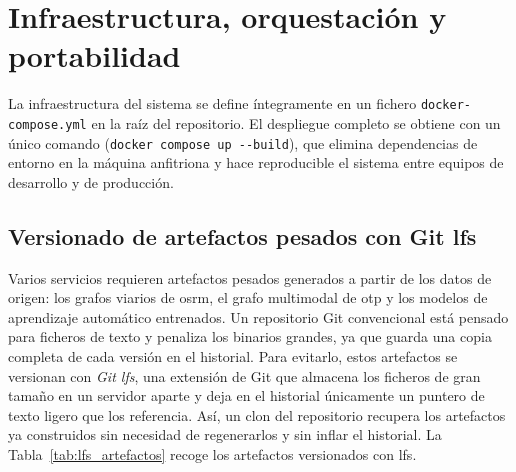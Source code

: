 \section{Infraestructura, orquestación y portabilidad}
\label{sec:arch_infra}

La infraestructura del sistema se define íntegramente en un fichero \texttt{docker-compose.yml} en la raíz del repositorio. El despliegue completo se obtiene con un único comando (\texttt{docker compose up -{}-build}), que elimina dependencias de entorno en la máquina anfitriona y hace reproducible el sistema entre equipos de desarrollo y de producción. 

\subsection[Versionado de artefactos pesados con Git LFS]{Versionado de artefactos pesados con Git \gls{lfs}}

Varios servicios requieren artefactos pesados generados a partir de los datos de origen: los grafos viarios de \gls{osrm}, el grafo multimodal de \gls{otp} y los modelos de aprendizaje automático entrenados. Un repositorio Git convencional está pensado para ficheros de texto y penaliza los binarios grandes, ya que guarda una copia completa de cada versión en el historial. Para evitarlo, estos artefactos se versionan con \textit{Git \gls{lfs}}, una extensión de Git que almacena los ficheros de gran tamaño en un servidor aparte y deja en el historial únicamente un puntero de texto ligero que los referencia. Así, un clon del repositorio recupera los artefactos ya construidos sin necesidad de regenerarlos y sin inflar el historial. La Tabla~\ref{tab:lfs_artefactos} recoge los artefactos versionados con \gls{lfs}.

